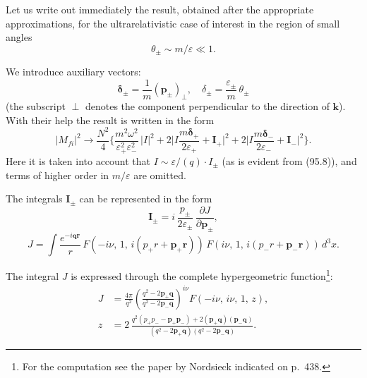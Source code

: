 
Let us write out immediately the result, obtained after the appropriate approximations, for the ultrarelativistic case of interest in the region of small angles
\begin{equation}
\theta_\pm \sim m/\varepsilon \ll 1.
\label{eq:95.9}
\end{equation}

We introduce auxiliary vectors:
\begin{equation}
\boldsymbol{\delta}_\pm = \frac{1}{m}(\mathbf{p}_\pm)_\perp, \quad \delta_\pm = \frac{\varepsilon_\pm}{m}\,\theta_\pm
\label{eq:95.10}
\end{equation}
(the subscript $\perp$ denotes the component perpendicular to the direction of $\mathbf{k}$). With their help the result is written in the form
\begin{equation}
|M_{fi}|^2 \to \frac{N^2}{4}\biggl\{\frac{m^2\omega^2}{\varepsilon_+^2\varepsilon_-^2}\,|I|^2 + 2\biggl|I\frac{m\boldsymbol{\delta}_+}{2\varepsilon_+} + \mathbf{I}_+\biggr|^2 + 2\biggl|I\frac{m\boldsymbol{\delta}_-}{2\varepsilon_-} + \mathbf{I}_-\biggr|^2\biggr\}.
\label{eq:95.11}
\end{equation}
Here it is taken into account that $I \sim \varepsilon/(q)\cdot I_\pm$ (as is evident from (95.8)), and terms of higher order in $m/\varepsilon$ are omitted.

The integrals $\mathbf{I}_\pm$ can be represented in the form
\[
\mathbf{I}_\pm = i\,\frac{p_\pm}{2\varepsilon_\pm}\,\frac{\partial J}{\partial\mathbf{p}_\pm},
\]
\begin{equation}
J = \int\frac{e^{-i\mathbf{q}\mathbf{r}}}{r}\,F(-i\nu,\,1,\,i(p_+r + \mathbf{p}_+\mathbf{r}))\,F(i\nu,\,1,\,i(p_-r + \mathbf{p}_-\mathbf{r}))\,d^3x.
\label{eq:95.12}
\end{equation}

The integral $J$ is expressed through the complete hypergeometric function\footnote{For the computation see the paper by Nordsieck indicated on p.~438.}:
\begin{equation}
\begin{split}
J &= \frac{4\pi}{q^2}\left(\frac{q^2 - 2\mathbf{p}_+\mathbf{q}}{q^2 - 2\mathbf{p}_-\mathbf{q}}\right)^{\!i\nu}\!F(-i\nu,\,i\nu,\,1,\,z), \\
z &= 2\,\frac{q^2(p_+p_- - \mathbf{p}_+\mathbf{p}_-) + 2(\mathbf{p}_+\mathbf{q})(\mathbf{p}_-\mathbf{q})}{(q^2 - 2\mathbf{p}_+\mathbf{q})(q^2 - 2\mathbf{p}_-\mathbf{q})}.
\end{split}
\label{eq:95.13}
\end{equation}

